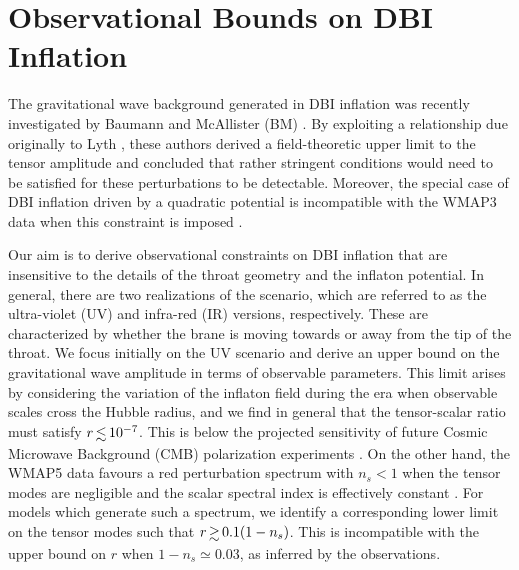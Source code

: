 \renewcommand{\CVSrevision}{\version$Id: dbi.tex,v 1.26 2009/09/16 15:47:02 ith Exp $}
% 

\chapter{Observational Bounds on DBI Inflation}
\label{ch:dbi}
% 
% 
% 

The gravitational wave background generated in DBI 
inflation was recently investigated by Baumann and McAllister (BM) 
\cite{bmpaper}. By exploiting a relationship due originally 
to Lyth \cite{lyth}, these authors derived a field-theoretic upper limit 
to the tensor amplitude and concluded that 
rather stringent conditions would need to be satisfied for these 
perturbations to be detectable.      
Moreover, the special case of 
DBI inflation driven by a quadratic potential is incompatible with the WMAP3 
data when this constraint is imposed \cite{bean}.  


Our aim is to derive observational constraints on DBI inflation that are 
insensitive to the details of the throat geometry and the inflaton potential. 
In general, there are two realizations of the scenario, 
which are referred to as the ultra-violet (UV) and infra-red (IR) 
versions, respectively. These are characterized by whether the brane is 
moving towards or away from the tip of the throat. 
We focus initially on the UV scenario 
and derive an upper bound on 
the gravitational wave amplitude in terms of observable 
parameters. This limit arises by considering 
the variation of the inflaton field during the era when 
observable scales cross the Hubble radius, and 
we find in general that the tensor-scalar ratio must satisfy 
$r \, \lsim \, 10^{-7}$. This 
is below the projected sensitivity of future Cosmic Microwave Background (CMB) polarization 
experiments \cite{vpj}. 
On the other hand, the WMAP5 data 
favours a red perturbation spectrum with 
$n_s<1$ when the tensor modes are negligible and 
the scalar spectral index is effectively constant \cite{Komatsu:2008hk}. 
For models which generate such a spectrum, 
we identify a corresponding lower limit on the 
tensor modes such that $r \, \gsim \, 0.1 (1-n_s)$. 
This is incompatible with the upper bound 
on $r$ when $1-n_s \simeq 0.03$, as inferred
by the observations. 

